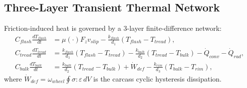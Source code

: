 \documentclass[11pt,a4paper,reqno]{article}
\def\bm#1{#1}%
\def\mathrm#1{#1}%
\theoremstyle{plain}
\theoremstyle{definition}
\theoremstyle{remark}
\numberwithin{equation}{section}
\begin{document}
\subsection{Three-Layer Transient Thermal Network}
Friction-induced heat is governed by a 3-layer finite-difference network:
\begin{align}
  C_{\mathrm{flash}}\frac{dT_{\mathrm{flash}}}{dt} &= \mu(\cdot) F_z v_{\mathrm{slip}} - \frac{k_{\mathrm{flash}}}{d_1}\left(T_{\mathrm{flash}} - T_{\mathrm{tread}}\right), \label{eq:flash_temp} \\
  C_{\mathrm{tread}}\frac{dT_{\mathrm{tread}}}{dt} &= \frac{k_{\mathrm{flash}}}{d_1}\left(T_{\mathrm{flash}} - T_{\mathrm{tread}}\right) - \frac{k_{\mathrm{bulk}}}{d_2}\left(T_{\mathrm{tread}} - T_{\mathrm{bulk}}\right) - \dot{Q}_{\mathrm{conv}} - \dot{Q}_{\mathrm{rad}}, \label{eq:tread_temp} \\
  C_{\mathrm{bulk}}\frac{dT_{\mathrm{bulk}}}{dt} &= \frac{k_{\mathrm{bulk}}}{d_2}\left(T_{\mathrm{tread}} - T_{\mathrm{bulk}}\right) + \dot{W}_{\mathrm{def}} - \frac{k_{\mathrm{rim}}}{d_3}\left(T_{\mathrm{bulk}} - T_{\mathrm{rim}}\right), \label{eq:bulk_temp}
\end{align}
where $\dot{W}_{\mathrm{def}} = \omega_{\mathrm{wheel}} \oint \bm{\sigma} : \bm{\varepsilon}\,dV$ is the carcass cyclic hysteresis dissipation.
\end{document}
